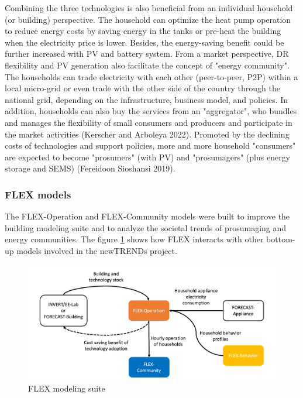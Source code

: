 Combining the three technologies is also beneficial from an individual household (or building) perspective. The household can optimize the heat pump operation to reduce energy costs by saving energy in the tanks or pre-heat the building when the electricity price is lower. Besides, the energy-saving benefit could be further increased with PV and battery system.
From a market perspective, DR flexibility and PV generation also facilitate the concept of "energy community". The households can trade electricity with each other (peer-to-peer, P2P) within a local micro-grid or even trade with the other side of the country through the national grid, depending on the infrastructure, business model, and policies. In addition, households can also buy the services from an "aggregator", who bundles and manages the flexibility of small consumers and producers and participate in the market activities (Kerscher and Arboleya 2022). 
Promoted by the declining costs of technologies and support policies, more and more household "consumers" are expected to become "prosumers" (with PV) and "prosumagers" (plus energy storage and SEMS) (Fereidoon Sioshansi 2019).

\subsubsection{FLEX models}

The FLEX-Operation and FLEX-Community models were built to improve the building modeling suite and to analyze the societal trends of prosumaging and energy communities.
The figure \ref{fig:flex} shows how FLEX interacts with other bottom-up models involved in the newTRENDs project.

\begin{figure}[h]
  \centering
  \includegraphics[width=\textwidth]{Images/flex.png}
  \caption{FLEX modeling suite}
  \label{fig:flex}
\end{figure}

